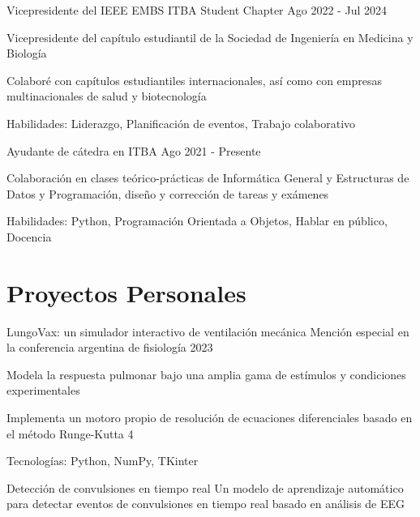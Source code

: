 \documentclass{resume}
\begin{document}
    \resumeSubheading
    {Vicepresidente del IEEE EMBS ITBA Student Chapter}{}
    {}{Ago 2022 - Jul 2024}
    \vspace{-5mm}
    \resumeItemListStart
    \item{Vicepresidente del capítulo estudiantil de la Sociedad de Ingeniería en Medicina y Biología}
    \item{Colaboré con capítulos estudiantiles internacionales,
        así como con empresas multinacionales de salud y biotecnología}
    \item {Habilidades: Liderazgo, Planificación de eventos, Trabajo colaborativo}
    \resumeItemListEnd


    \resumeSubheading
    {Ayudante de cátedra en ITBA}{}
    {}{Ago 2021 - Presente}
    \vspace{-5mm}
    \resumeItemListStart
    \item
    {Colaboración en clases teórico-prácticas de Informática General y Estructuras de Datos y Programación,
        diseño y corrección de tareas y exámenes}
    \item {Habilidades: Python, Programación Orientada a Objetos, Hablar en público, Docencia}
    \resumeItemListEnd
    \resumeSubHeadingListEnd

    \vspace{-5mm}


    \section{\textbf{Proyectos Personales}} \label{sec:projects}
    \resumeSubHeadingListStart
    \resumeProject
    {LungoVax: un simulador interactivo de ventilación mecánica} %
    {Mención especial en la conferencia argentina de fisiología 2023} %
    {} %

    \resumeItemListStart
    \item {Modela la respuesta pulmonar bajo una amplia gama de estímulos y condiciones experimentales}
    \item {Implementa un motoro propio de resolución de ecuaciones diferenciales basado en el método Runge-Kutta 4}
    \item {Tecnologías: Python, NumPy, TKinter}
    \resumeItemListEnd

    \resumeProject
    {Detección de convulsiones en tiempo real} %
    {Un modelo de aprendizaje automático para detectar eventos de convulsiones en tiempo real basado en análisis de EEG}
    {} %
\end{document}
